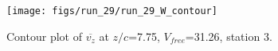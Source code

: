 \begin{figure}[H]
\centering
\texttt{[image: figs/run\_29/run\_29\_W\_contour]}
\caption{Contour plot of $\overline{v_{z}}$ at $z/c$=7.75, $V_{free}$=31.26, station 3.}
\label{fig:run_29_W_contour}
\end{figure}


